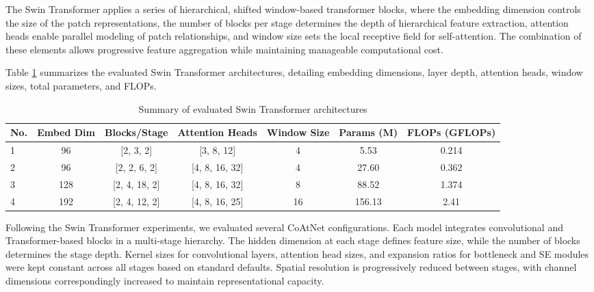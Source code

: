 \documentclass[a4paper,11pt,twoside]{report}
\theoremstyle{definition}
\begin{document}
The Swin Transformer applies a series of hierarchical, shifted window-based transformer blocks, where the embedding dimension controls the size of the patch representations, the number of blocks per stage determines the depth of hierarchical feature extraction, attention heads enable parallel modeling of patch relationships, and window size sets the local receptive field for self-attention. The combination of these elements allows progressive feature aggregation while maintaining manageable computational cost.

Table \ref{tab:swin_transformer_architectures} summarizes the evaluated Swin Transformer architectures, detailing embedding dimensions, layer depth, attention heads, window sizes, total parameters, and FLOPs.

\begin{table}[h!]
\centering
\caption{Summary of evaluated Swin Transformer architectures}
\begin{adjustbox}{max width=\textwidth}
\begin{tabular}{lcccccc}
\hline
\textbf{No.} & \textbf{Embed Dim} & \textbf{Blocks/Stage} & \textbf{Attention Heads} & \textbf{Window Size} & \textbf{Params (M)} & \textbf{FLOPs (GFLOPs)} \\
\hline
1 & 96  & [2, 3, 2]      & [3, 8, 12]      & 4 & 5.53   & 0.214 \\
2 & 96  & [2, 2, 6, 2]   & [4, 8, 16, 32]  & 4 & 27.60  & 0.362 \\
3 & 128 & [2, 4, 18, 2]  & [4, 8, 16, 32]  & 8 & 88.52  & 1.374 \\
4 & 192 & [2, 4, 12, 2]  & [4, 8, 16, 25]  & 16 & 156.13 & 2.41 \\
\hline
\end{tabular}
\end{adjustbox}
\label{tab:swin_transformer_architectures}
\end{table}



Following the Swin Transformer experiments, we evaluated several CoAtNet configurations. Each model integrates convolutional and Transformer-based blocks in a multi-stage hierarchy. The hidden dimension at each stage defines feature size, while the number of blocks determines the stage depth. Kernel sizes for convolutional layers, attention head sizes, and expansion ratios for bottleneck and SE modules were kept constant across all stages based on standard defaults. Spatial resolution is progressively reduced between stages, with channel dimensions correspondingly increased to maintain representational capacity.
\end{document}
